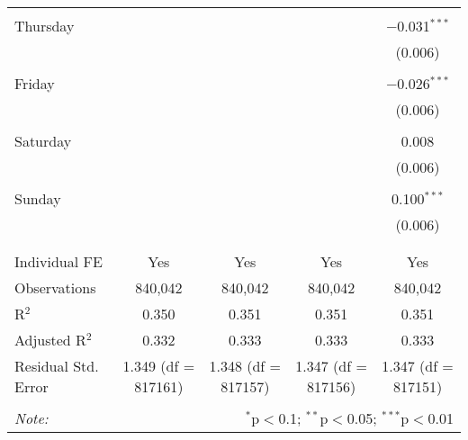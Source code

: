 \documentclass[
]{article}
\begin{document}
\begin{table}[!htbp]
{\begin{tabular}{@{\extracolsep{5pt}}lcccc}
  & & & & \\ 
 Thursday &  &  &  & $-$0.031$^{***}$ \\ 
  &  &  &  & (0.006) \\ 
  & & & & \\ 
 Friday &  &  &  & $-$0.026$^{***}$ \\ 
  &  &  &  & (0.006) \\ 
  & & & & \\ 
 Saturday &  &  &  & 0.008 \\ 
  &  &  &  & (0.006) \\ 
  & & & & \\ 
 Sunday &  &  &  & 0.100$^{***}$ \\ 
  &  &  &  & (0.006) \\ 
  & & & & \\ 
\hline \\[-1.8ex] 
Individual FE & Yes & Yes & Yes & Yes \\ 
Observations & 840,042 & 840,042 & 840,042 & 840,042 \\ 
R$^{2}$ & 0.350 & 0.351 & 0.351 & 0.351 \\ 
Adjusted R$^{2}$ & 0.332 & 0.333 & 0.333 & 0.333 \\ 
Residual Std. Error & 1.349 (df = 817161) & 1.348 (df = 817157) & 1.347 (df = 817156) & 1.347 (df = 817151) \\ 
\hline 
\hline \\[-1.8ex] 
\textit{Note:}  & \multicolumn{4}{r}{$^{*}$p$<$0.1; $^{**}$p$<$0.05; $^{***}$p$<$0.01} \\ 
\end{tabular}
} 
\end{table} 
\newpage
\end{document}
